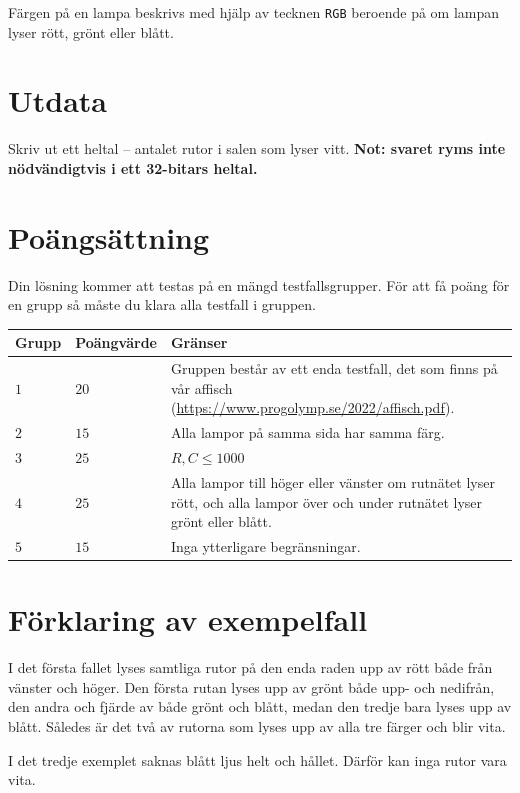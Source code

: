Färgen på en lampa beskrivs med hjälp av tecknen \texttt{RGB} beroende på om lampan lyser rött, grönt eller blått.

\section*{Utdata}
Skriv ut ett heltal -- antalet rutor i salen som lyser vitt.
\textbf{Not: svaret ryms inte nödvändigtvis i ett 32-bitars heltal.}

\section*{Poängsättning}
Din lösning kommer att testas på en mängd testfallsgrupper.
För att få poäng för en grupp så måste du klara alla testfall i gruppen.

\noindent
\begin{tabular}{| l | l | p{12cm} |}
  \hline
  Grupp & Poängvärde & Gränser \\ \hline
  $1$    & $20$        &  Gruppen består av ett enda testfall, det som finns på vår affisch (\url{https://www.progolymp.se/2022/affisch.pdf}). \\ \hline 
  $2$    & $15$        &  Alla lampor på samma sida har samma färg. \\ \hline
  $3$    & $25$        &  $R,C \le 1000$ \\ \hline 
  $4$    & $25$        &  Alla lampor till höger eller vänster om rutnätet lyser rött, och alla lampor över och under rutnätet lyser grönt eller blått. \\ \hline
  $5$    & $15$        &  Inga ytterligare begränsningar. \\ \hline
\end{tabular}

\section*{Förklaring av exempelfall}
I det första fallet lyses samtliga rutor på den enda raden upp av rött både från vänster och höger.
Den första rutan lyses upp av grönt både upp- och nedifrån, den andra och fjärde av både grönt och blått, medan den tredje bara lyses upp av blått.
Således är det två av rutorna som lyses upp av alla tre färger och blir vita.

I det tredje exemplet saknas blått ljus helt och hållet.
Därför kan inga rutor vara vita.
